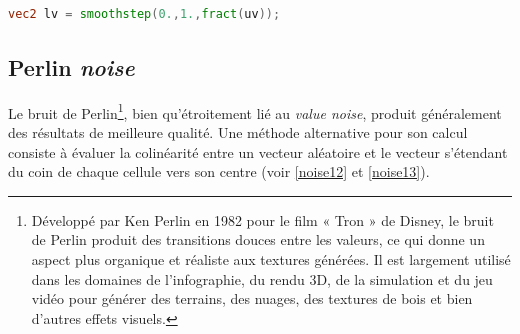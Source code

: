 \begin{minipage}{\linewidth}
\begin{lstlisting}[language=GLSL, caption=\lstinline{smoothstep()} pour adoucir le bruit,captionpos=b,frame=single]
vec2 lv = smoothstep(0.,1.,fract(uv));
\end{lstlisting}
\end{minipage}

\subsection*{Perlin \textit{noise}}

Le bruit de Perlin\footnote{Développé par Ken Perlin en 1982 pour le film « Tron » de Disney, le bruit de Perlin produit des transitions douces entre les valeurs, ce qui donne un aspect plus organique et réaliste aux textures générées. Il est largement utilisé dans les domaines de l'infographie, du rendu 3D, de la simulation et du jeu vidéo pour générer des terrains, des nuages, des textures de bois et bien d'autres effets visuels.}, bien qu'étroitement lié au \textit{value noise}, produit généralement des résultats de meilleure qualité. Une méthode alternative pour son calcul consiste à évaluer la colinéarité entre un vecteur aléatoire et le vecteur s'étendant du coin de chaque cellule vers son centre (voir \ref{noise12} et \ref{noise13}).

